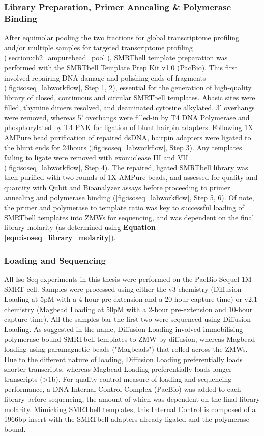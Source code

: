 \subsubsection{Library Preparation, Primer Annealing \& Polymerase Binding}
\label{section:ch2_smrtbelltemplate_explanation} 
After equimolar pooling the two fractions for global transcriptome profiling and/or multiple samples for targeted transcriptome profiling (\cref{section:ch2_ampurebead_pool}), SMRTbell template preparation was performed with the SMRTbell Template Prep Kit v1.0 (PacBio). This first involved repairing DNA damage and polishing ends of fragments (\cref{fig:isoseq_labworkflow}, Step 1, 2), essential for the generation of high-quality library of closed, continuous and circular SMRTbell templates. Abasic sites were filled, thymine dimers resolved, and deaminated cytosine alkylated. 3’ overhangs were removed, whereas 5’ overhangs were filled-in by T4 DNA Polymerase and phosphorylated by T4 PNK for ligation of blunt hairpin adapters. Following 1X AMPure bead purification of repaired dsDNA, hairpin adapters were ligated to the blunt ends for 24hours (\cref{fig:isoseq_labworkflow}, Step 3). Any templates failing to ligate were removed with exonuclease III and VII (\cref{fig:isoseq_labworkflow}, Step 4). The repaired, ligated SMRTbell library was then purified with two rounds of 1X AMPure beads, and assessed for quality and quantity with Qubit and Bioanalyzer assays before proceeding to primer annealing and polymerase binding (\cref{fig:isoseq_labworkflow}, Step 5, 6). Of note, the primer and polymerase to template ratio was key to successful loading of SMRTbell templates into ZMWs for sequencing, and was dependent on the final library molarity (as determined using \textbf{Equation \ref{eqn:isoseq_library_molarity}}). 


\subsubsection{Loading and Sequencing} 
\label{section:ch2_sequencing}
All Iso-Seq experiments in this thesis were performed on the PacBio Sequel 1M SMRT cell. Samples were processed using either the v3 chemistry (Diffusion Loading at 5pM with a 4-hour pre-extension and a 20-hour capture time) or v2.1 chemistry (Magbead Loading at 50pM with a 2-hour pre-extension and 10-hour capture time). All the samples bar the first two were sequenced using Diffusion Loading. As suggested in the name, Diffusion Loading involved immobilising polymerase-bound SMRTbell templates to ZMW by diffusion, whereas Magbead loading using paramagnetic beads ("Magbeads") that rolled across the ZMWs. Due to the different nature of loading, Diffusion Loading preferentially loads shorter transcripts, whereas Magbead Loading preferentially loads longer transcripts (>1b). For quality-control measure of loading and sequencing performance, a DNA Internal Control Complex (PacBio) was added to each library before sequencing, the amount of which was dependent on the final library molarity. Mimicking SMRTbell templates, this Internal Control is composed of a 1966bp-insert with the SMRTbell adapters already ligated and the  polymerase bound.


